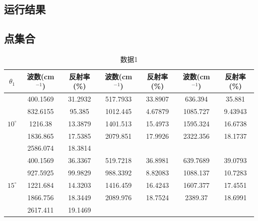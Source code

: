 \documentclass[withoutpreface,bwprint]{cumcmthesis} %
\begin{document}
\newpage
\begin{appendices}

\section{运行结果}
\subsection{点集合}
\begin{table}[H]
    \centering  %
    \caption{数据1}  %
    \label{tab:数据1}  %
    \begin{threeparttable}
        \begin{tabularx}{\textwidth}{c |c c | c c | c c}
            \toprule[1.5pt]
            $\theta_1$& \textbf{波数(cm$^{-1}$)} & \textbf{反射率(\%)} & \textbf{波数(cm$^{-1}$)}  & \textbf{反射率(\%)} & \textbf{波数(cm$^{-1}$)} & \textbf{反射率(\%)}   \\ 
            \midrule[1pt]
            \multirow{5}{*}{$10^\circ$}& 400.1569 &    31.2932 &   517.7933 &    33.8907 &    636.394 &     35.881\\
            & 832.6155 &     95.385 &   1012.445 &    4.67879 &   1085.727 &    9.43943\\
            & 1216.38 &    13.3879 &   1401.513 &    15.4973 &   1595.324 &    16.6738\\
            & 1836.865 &    17.5385 &   2079.851 &    17.9926 &   2322.356 &    18.1737\\
            & 2586.074 &    18.3814 & \\
            \midrule[1pt]
            \multirow{5}{*}{$15^\circ$} & 400.1569 &    36.3367 &   519.7218 &    36.8981 &   639.7689 &    39.0793\\
            & 927.5925 &    99.9829 &   988.3392 &    8.82083 &   1088.137 &    10.7283\\
            & 1221.684 &    14.3203 &   1416.459 &    16.4243 &   1607.377 &    17.4551\\
            & 1866.756 &    18.3449 &   2089.976 &    18.7524 &    2389.37 &    18.6991\\
            & 2617.411 &    19.1469 & \\


\end{tabularx}
\end{threeparttable}
\end{table}
\end{appendices}
\end{document}
